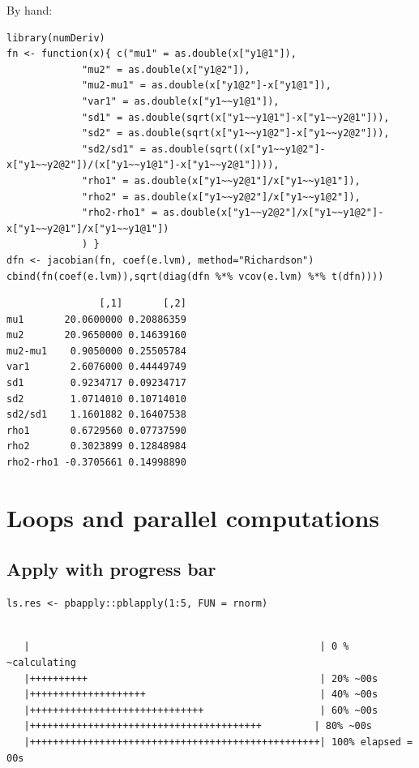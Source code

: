 \documentclass{article}
\begin{document}
By hand:
\lstset{language=r,label= ,caption= ,captionpos=b,numbers=none}
\begin{lstlisting}
library(numDeriv)
fn <- function(x){ c("mu1" = as.double(x["y1@1"]),
		     "mu2" = as.double(x["y1@2"]),
		     "mu2-mu1" = as.double(x["y1@2"]-x["y1@1"]),
		     "var1" = as.double(x["y1~~y1@1"]),
		     "sd1" = as.double(sqrt(x["y1~~y1@1"]-x["y1~~y2@1"])),
		     "sd2" = as.double(sqrt(x["y1~~y1@2"]-x["y1~~y2@2"])),
		     "sd2/sd1" = as.double(sqrt((x["y1~~y1@2"]-x["y1~~y2@2"])/(x["y1~~y1@1"]-x["y1~~y2@1"]))),
		     "rho1" = as.double(x["y1~~y2@1"]/x["y1~~y1@1"]),
		     "rho2" = as.double(x["y1~~y2@2"]/x["y1~~y1@2"]),
		     "rho2-rho1" = as.double(x["y1~~y2@2"]/x["y1~~y1@2"]-x["y1~~y2@1"]/x["y1~~y1@1"])
		     ) }
dfn <- jacobian(fn, coef(e.lvm), method="Richardson")
cbind(fn(coef(e.lvm)),sqrt(diag(dfn %*% vcov(e.lvm) %*% t(dfn))))
\end{lstlisting}

\begin{verbatim}
                [,1]       [,2]
mu1       20.0600000 0.20886359
mu2       20.9650000 0.14639160
mu2-mu1    0.9050000 0.25505784
var1       2.6076000 0.44449749
sd1        0.9234717 0.09234717
sd2        1.0714010 0.10714010
sd2/sd1    1.1601882 0.16407538
rho1       0.6729560 0.07737590
rho2       0.3023899 0.12848984
rho2-rho1 -0.3705661 0.14998890
\end{verbatim}

\section{Loops and parallel computations}
\label{sec:orga0f659e}
\subsection{Apply with progress bar}
\label{sec:org7454fed}

\lstset{language=r,label= ,caption= ,captionpos=b,numbers=none}
\begin{lstlisting}
ls.res <- pbapply::pblapply(1:5, FUN = rnorm)
\end{lstlisting}

\begin{verbatim}

   |                                                  | 0 % ~calculating  
   |++++++++++                                        | 20% ~00s          
   |++++++++++++++++++++                              | 40% ~00s          
   |++++++++++++++++++++++++++++++                    | 60% ~00s          
   |++++++++++++++++++++++++++++++++++++++++         | 80% ~00s          
   |++++++++++++++++++++++++++++++++++++++++++++++++++| 100% elapsed = 00s
\end{verbatim}
\end{document}
